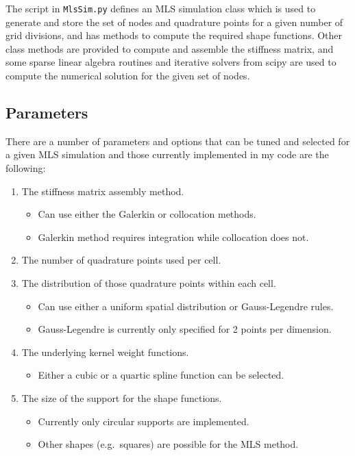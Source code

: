 \documentclass{article}
\begin{document}
The script in \texttt{MlsSim.py} defines an MLS simulation class which is used to generate and store the set of nodes and quadrature points for a given number of grid divisions, and has methods to compute the required shape functions. Other class methods are provided to compute and assemble the stiffness matrix, and some sparse linear algebra routines and iterative solvers from scipy are used to compute the numerical solution for the given set of nodes.

\subsection{Parameters}

There are a number of parameters and options that can be tuned and selected for a given MLS simulation and those currently implemented in my code are the following:

\begin{enumerate}
\item The stiffness matrix assembly method.
	\begin{itemize}
	\item Can use either the Galerkin or collocation methods.
	\item Galerkin method requires integration while collocation does not.
	\end{itemize}
\item The number of quadrature points used per cell.
\item The distribution of those quadrature points within each cell.
	\begin{itemize}
	\item Can use either a uniform spatial distribution or Gauss-Legendre rules.
	\item Gauss-Legendre is currently only specified for 2 points per dimension.
	\end{itemize}
\item The underlying kernel weight functions.
	\begin{itemize}
	\item Either a cubic or a quartic spline function can be selected.
	\end{itemize}
\item The size of the support for the shape functions.
	\begin{itemize}
	\item Currently only circular supports are implemented.
	\item Other shapes (e.g.~squares) are possible for the MLS method.
	\end{itemize}
\end{enumerate}
\end{document}
